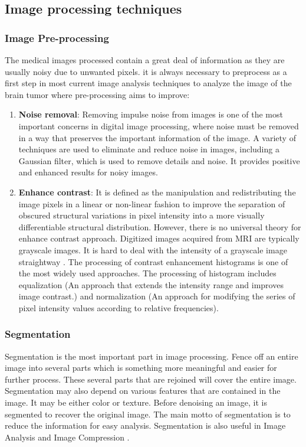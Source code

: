 \subsection{Image processing techniques}

\subsubsection{Image Pre-processing}
The medical images processed contain a great deal of information as
they are usually noisy due to unwanted pixels. it is always necessary to preprocess as a first step in most current image analysis techniques to analyze
the image of the brain tumor where pre-processing aims to improve:

\begin{enumerate}
  \item \textbf{Noise removal}: Removing impulse noise from images is one of the most important concerns in digital image processing, where noise must be removed in a way that preserves the important information of the image. A variety of techniques are used to eliminate and reduce noise in images, including a Gaussian filter, which is used to remove details and noise. It provides positive and enhanced results for noisy images.
  \item \textbf{Enhance contrast}: It is defined as the manipulation and redistributing the image pixels in a linear or non-linear fashion to improve the separation of obscured structural variations in pixel intensity into a more visually differentiable structural distribution. However, there is no universal theory for enhance contrast approach. Digitized images acquired from MRI are typically grayscale images. It is hard to deal with the intensity of a grayscale image straightway \cite{nishu2012quantifying}. The processing of contrast enhancement histograms is one of the most widely used approaches. The processing of histogram includes equalization (An approach that extends the intensity range and improves image contrast.) and normalization (An approach for modifying the series of pixel intensity values according to relative frequencies).
\end{enumerate}

\subsubsection{Segmentation}
Segmentation is the most important part in image processing. Fence
off an entire image into several parts which is something more meaningful
and easier for further process. These several parts that are rejoined will
cover the entire image. Segmentation may also depend on various features
that are contained in the image. It may be either color or texture. Before
denoising an image, it is segmented to recover the original image. The
main motto of segmentation is to reduce the information for easy analysis.
Segmentation is also useful in Image Analysis and Image Compression \cite{yogamangalam2013segmentation}.


